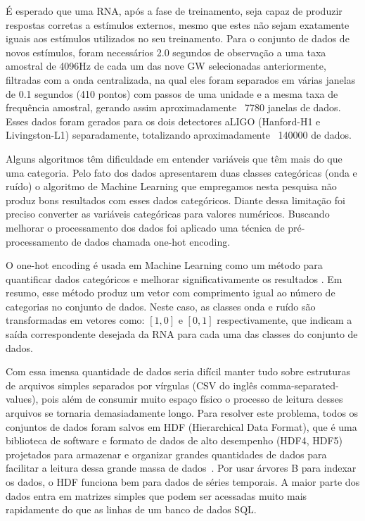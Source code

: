 É esperado que uma RNA, após a fase de treinamento, seja capaz de produzir respostas corretas a estímulos externos, mesmo que estes não sejam exatamente iguais aos estímulos utilizados no seu treinamento. Para o conjunto de dados de novos estímulos, foram necessários 2.0 segundos de observação a uma taxa amostral de 4096Hz de cada um das nove GW selecionadas anteriormente, filtradas com a onda centralizada, na qual eles foram separados em várias janelas de 0.1 segundos (410 pontos) com passos de uma unidade e a mesma taxa de frequência amostral, gerando assim aproximadamente ~7780 janelas de dados. Esses dados foram gerados para os dois detectores aLIGO (Hanford-H1 e Livingston-L1) separadamente, totalizando aproximadamente ~140000 de dados.

Alguns algoritmos têm dificuldade em entender variáveis que têm mais do que uma categoria. Pelo fato dos dados apresentarem duas classes categóricas (onda e ruído) o algoritmo de Machine Learning que empregamos nesta pesquisa não produz bons resultados com esses dados categóricos. Diante dessa limitação foi preciso converter as variáveis categóricas para valores numéricos. Buscando melhorar o processamento dos dados foi aplicado uma técnica de pré-processamento de dados chamada one-hot encoding. 

O one-hot encoding é usada em Machine Learning como um método para quantificar dados categóricos e melhorar significativamente os resultados \cite{sarkar2017practical}. Em resumo, esse método produz um vetor com comprimento igual ao número de categorias no conjunto de dados. Neste caso, as classes onda e ruído são transformadas em vetores como: $[1,0]$ e $[0,1]$ respectivamente, que indicam a saída correspondente desejada da RNA para cada uma das classes do conjunto de dados.

Com essa imensa quantidade de dados seria difícil manter tudo sobre estruturas de arquivos simples separados por vírgulas (CSV do inglês comma-separated-values), pois além de consumir muito espaço físico o processo de leitura desses arquivos se tornaria demasiadamente longo. Para resolver este problema, todos os conjuntos de dados foram salvos em HDF (Hierarchical Data Format), que é uma biblioteca de software e formato de dados de alto desempenho (HDF4, HDF5) projetados para armazenar e organizar grandes quantidades de dados para facilitar a leitura dessa grande massa de dados~\cite{hdf}. Por usar árvores B para indexar os dados, o HDF funciona bem para dados de séries temporais. A maior parte dos dados entra em matrizes simples que podem ser acessadas muito mais rapidamente do que as linhas de um banco de dados SQL. 

